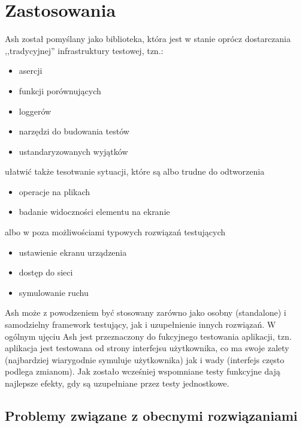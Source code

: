 \documentclass[brudnopis]{xmgr}
\begin{document}
\chapter{Zastosowania}
Ash został pomyślany jako biblioteka, która jest w stanie oprócz dostarczania ,,tradycyjnej'' infrastruktury testowej, tzn.:
\begin{itemize}
  \item asercji
  \item funkcji porównujących
  \item loggerów
  \item narzędzi do budowania testów
  \item ustandaryzowanych wyjątków
\end{itemize}
ułatwić także tesotwanie sytuacji, które są albo trudne do odtworzenia
\begin{itemize}
  \item operacje na plikach
  \item badanie widoczności elementu na ekranie
\end{itemize}
 albo w poza możliwościami typowych rozwiązań testujących
\begin{itemize}
  \item ustawienie ekranu urządzenia
  \item dostęp do sieci
  \item symulowanie ruchu
\end{itemize}
Ash może z powodzeniem być stosowany zarówno jako osobny (standalone) i samodzielny framework testujący, jak i uzupełnienie innych rozwiązań. W ogólnym ujęciu Ash jest przeznaczony do fukcyjnego testowania aplikacji, tzn. aplikacja jest testowana od strony interfejsu użytkownika, co ma swoje zalety (najbardziej wiarygodnie symuluje użytkownika) jak i wady (interfejs często podlega zmianom). Jak zostało wcześniej wspomniane testy funkcyjne dają najlepsze efekty, gdy są uzupełniane przez testy jednostkowe.  

\section{Problemy związane z obecnymi rozwiązaniami}
\end{document}
